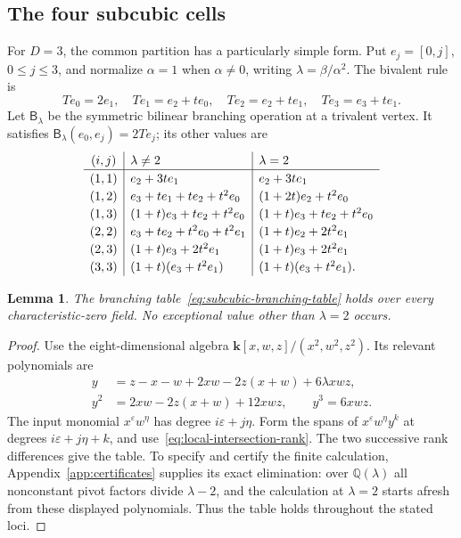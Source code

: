 \documentclass[reqno]{article}
\theoremstyle{plain} %
\newtheorem{lemma}[theorem]{Lemma}
\theoremstyle{definition}
\theoremstyle{remark}
\newcommand{\K} {\mathbf{k}}
\numberwithin{equation}{section}
\begin{document}
\subsection{The four subcubic cells}
\label{sec:subcubic-cells}

For $D=3$, the common partition has a particularly simple form.
Put $e_j=[0,j]$, $0\le j\le3$, and normalize $\alpha=1$ when
$\alpha\ne0$, writing $\lambda=\beta/\alpha^2$.
The bivalent rule is
\[
Te_0=2e_1,\quad Te_1=e_2+te_0,\quad
Te_2=e_2+te_1,\quad Te_3=e_3+te_1.
\]
Let $\mathsf B_\lambda$ be the symmetric bilinear branching operation at
a trivalent vertex. It satisfies
$\mathsf B_\lambda(e_0,e_j)=2Te_j$; its other values are
\begin{equation}\label{eq:subcubic-branching-table}
\renewcommand{\arraystretch}{1.18}
\begin{array}{c|l|l}
(i,j)&\lambda\ne2&\lambda=2\\\hline
(1,1)&e_2+3te_1&e_2+3te_1\\
(1,2)&e_3+te_1+te_2+t^2e_0&(1+2t)e_2+t^2e_0\\
(1,3)&(1+t)e_3+te_2+t^2e_0&(1+t)e_3+te_2+t^2e_0\\
(2,2)&e_3+te_2+t^2e_0+t^2e_1&(1+t)e_2+2t^2e_1\\
(2,3)&(1+t)e_3+2t^2e_1&(1+t)e_3+2t^2e_1\\
(3,3)&(1+t)(e_3+t^2e_1)&(1+t)(e_3+t^2e_1).
\end{array}
\end{equation}

\begin{lemma}\label{lem:subcubic-branching}
The branching table~\eqref{eq:subcubic-branching-table} holds over every
characteristic-zero field. No exceptional value other than $\lambda=2$
occurs.
\end{lemma}
\begin{proof}
Use the eight-dimensional algebra
$\K[x,w,z]/(x^2,w^2,z^2)$. Its relevant polynomials are
\begin{align*}
y&=z-x-w+2xw-2z(x+w)+6\lambda xwz,\\
y^2&=2xw-2z(x+w)+12xwz,\qquad y^3=6xwz.
\end{align*}
The input monomial $x^\varepsilon w^\eta$ has degree
$i\varepsilon+j\eta$. Form the spans of
$x^\varepsilon w^\eta y^k$ at degrees $i\varepsilon+j\eta+k$,
and use~\eqref{eq:local-intersection-rank}. The two successive rank
differences give the table. To specify and certify the finite calculation,
Appendix~\ref{app:certificates} supplies its exact elimination: over
$\mathbb{Q}(\lambda)$ all nonconstant pivot factors divide $\lambda-2$,
and the calculation at $\lambda=2$ starts afresh from these displayed
polynomials. Thus the table holds throughout the stated loci.
\end{proof}
\end{document}
